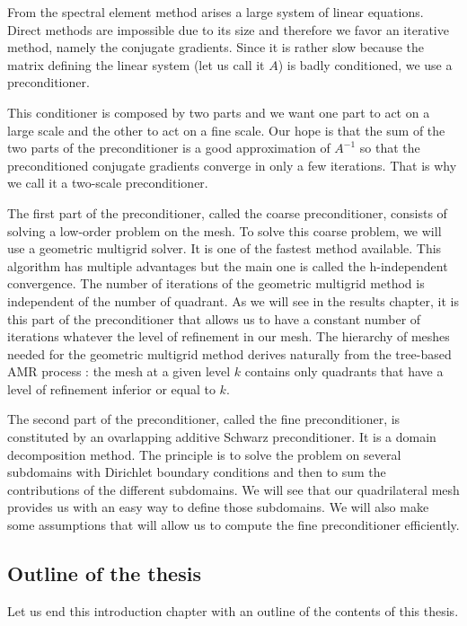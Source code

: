 From the spectral element method arises a large system of linear equations. Direct methods are impossible due to its size and therefore we favor an iterative method, namely the conjugate gradients. Since it is rather slow because the matrix defining the linear system (let us call it $A$) is badly conditioned, we use a preconditioner. 

This conditioner is composed by two parts and we want one part to act on a large scale and the other to act on a fine scale. Our hope is that the sum of the two parts of the preconditioner is a good approximation of $A^{-1}$ so that the preconditioned conjugate gradients converge in only a few iterations. That is why we call it a two-scale preconditioner.    

The first part of the preconditioner, called the coarse preconditioner, consists of solving a low-order problem on the mesh. To solve this coarse problem, we will use a geometric multigrid solver. It is one of the fastest method available. This algorithm has multiple advantages but the main one is called the h-independent convergence. The number of iterations of the geometric multigrid method is independent of the number of quadrant. As we will see in the results chapter, it is this part of the preconditioner that allows us to have a constant number of iterations whatever the level of refinement in our mesh. The hierarchy of meshes needed for the geometric multigrid method derives naturally from the tree-based AMR process : the mesh at a given level $k$ contains only quadrants that have a level of refinement inferior or equal to $k$.   

The second part of the preconditioner, called the fine preconditioner, is constituted by an ovarlapping additive Schwarz preconditioner. It is a domain decomposition method. The principle is to solve the problem on several subdomains with Dirichlet boundary conditions and then to sum the contributions of the different subdomains. We will see that our quadrilateral mesh provides us with an easy way to define those subdomains. We will also make some assumptions that will allow us to compute the fine preconditioner efficiently.   

\subsection*{Outline of the thesis}

Let us end this introduction chapter with an outline of the contents of this thesis. 

